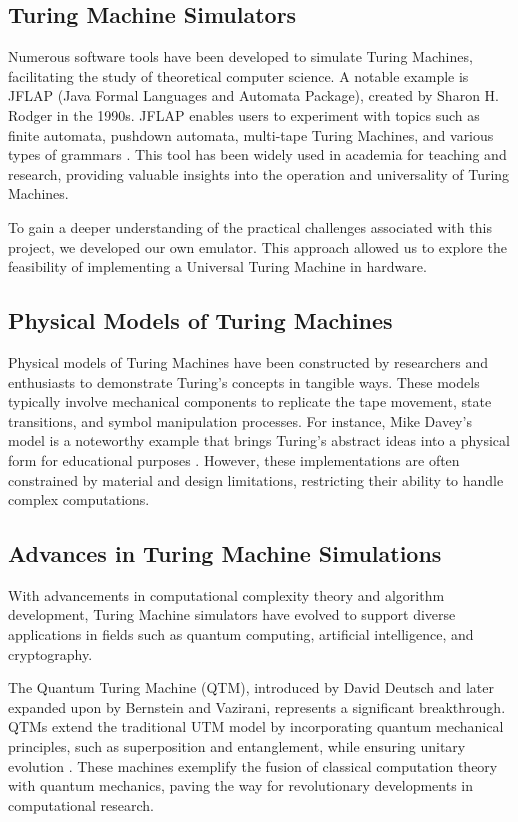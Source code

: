 \subsection{Turing Machine Simulators}

Numerous software tools have been developed to simulate Turing Machines, facilitating the study of theoretical computer science. A notable example is JFLAP (Java Formal Languages and Automata Package), created by Sharon H. Rodger in the 1990s. JFLAP enables users to experiment with topics such as finite automata, pushdown automata, multi-tape Turing Machines, and various types of grammars \cite{rodger1990s}. This tool has been widely used in academia for teaching and research, providing valuable insights into the operation and universality of Turing Machines.  

To gain a deeper understanding of the practical challenges associated with this project, we developed our own emulator. This approach allowed us to explore the feasibility of implementing a Universal Turing Machine in hardware.  

\subsection{Physical Models of Turing Machines}

Physical models of Turing Machines have been constructed by researchers and enthusiasts to demonstrate Turing's concepts in tangible ways. These models typically involve mechanical components to replicate the tape movement, state transitions, and symbol manipulation processes. For instance, Mike Davey’s model is a noteworthy example that brings Turing's abstract ideas into a physical form for educational purposes \cite{davey2010}. However, these implementations are often constrained by material and design limitations, restricting their ability to handle complex computations.  

\subsection{Advances in Turing Machine Simulations}

With advancements in computational complexity theory and algorithm development, Turing Machine simulators have evolved to support diverse applications in fields such as quantum computing, artificial intelligence, and cryptography.  

The Quantum Turing Machine (QTM), introduced by David Deutsch and later expanded upon by Bernstein and Vazirani, represents a significant breakthrough. QTMs extend the traditional UTM model by incorporating quantum mechanical principles, such as superposition and entanglement, while ensuring unitary evolution \cite{deutsch1985, bernstein1993}. These machines exemplify the fusion of classical computation theory with quantum mechanics, paving the way for revolutionary developments in computational research.  

